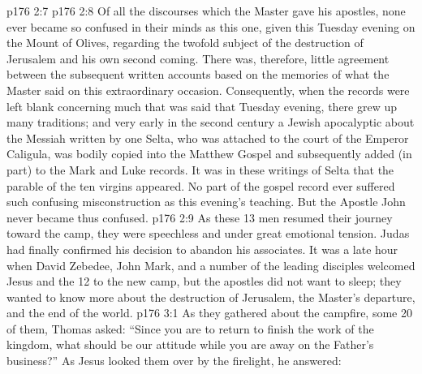 \vs p176 2:7 
\vs p176 2:8 Of all the discourses which the Master gave his apostles, none ever became so confused in their minds as this one, given this Tuesday evening on the Mount of Olives, regarding the twofold subject of the destruction of Jerusalem and his own second coming. There was, therefore, little agreement between the subsequent written accounts based on the memories of what the Master said on this extraordinary occasion. Consequently, when the records were left blank concerning much that was said that Tuesday evening, there grew up many traditions; and very early in the second century a Jewish apocalyptic about the Messiah written by one Selta, who was attached to the court of the Emperor Caligula, was bodily copied into the Matthew Gospel and subsequently added (in part) to the Mark and Luke records. It was in these writings of Selta that the parable of the ten virgins appeared. No part of the gospel record ever suffered such confusing misconstruction as this evening’s teaching. But the Apostle John never became thus confused.
\vs p176 2:9 As these 13 men resumed their journey toward the camp, they were speechless and under great emotional tension. Judas had finally confirmed his decision to abandon his associates. It was a late hour when David Zebedee, John Mark, and a number of the leading disciples welcomed Jesus and the 12 to the new camp, but the apostles did not want to sleep; they wanted to know more about the destruction of Jerusalem, the Master’s departure, and the end of the world.
\vs p176 3:1 As they gathered about the campfire, some 20 of them, Thomas asked: “Since you are to return to finish the work of the kingdom, what should be our attitude while you are away on the Father’s business?” As Jesus looked them over by the firelight, he answered:
